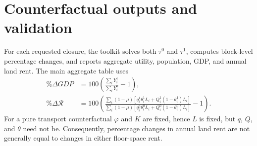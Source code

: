 \documentclass[11pt,a4paper]{article}
\newcommand{\Rland}{\mathcal{R}}
\begin{document}
\section{Counterfactual outputs and validation}
For each requested closure, the toolkit solves both $\tau^0$ and $\tau^1$,
computes block-level percentage changes, and reports aggregate utility,
population, GDP, and annual land rent. The main aggregate table uses
\begin{align}
 \%\Delta GDP &=100\left(\frac{\sum_iY_i^1}{\sum_iY_i^0}-1\right),\\
 \%\Delta\Rland&=100\left(
 \frac{\sum_i(1-\mu)[q_i^1\theta_i^1L_i+
 Q_i^1(1-\theta_i^1)L_i]}
 {\sum_i(1-\mu)[q_i^0\theta_i^0L_i+
 Q_i^0(1-\theta_i^0)L_i]}-1\right).                    \label{eq:reportland}
\end{align}
For a pure transport counterfactual $\varphi$ and $K$ are fixed, hence $L$ is
fixed, but $q$, $Q$, and $\theta$ need not be. Consequently, percentage changes
in annual land rent are not generally equal to changes in either floor-space
rent.
\end{document}
